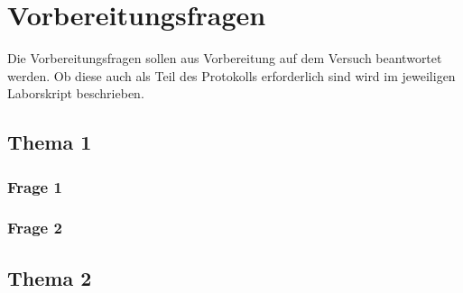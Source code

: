 \section{Vorbereitungsfragen}
Die Vorbereitungsfragen sollen aus Vorbereitung auf dem Versuch beantwortet werden. Ob diese auch als Teil des Protokolls erforderlich sind wird im jeweiligen Laborskript beschrieben.

\subsection{Thema 1}
\subsubsection{Frage 1}
\subsubsection{Frage 2}


\subsection{Thema 2}